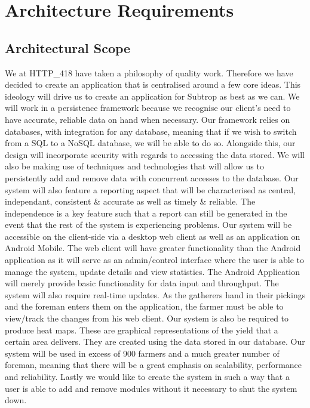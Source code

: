 \documentclass[11pt,fleqn]{book} %
\begin{document}
	\chapter{Architecture Requirements}
	
	\section{Architectural Scope}
		We at HTTP_418 have taken a philosophy of quality work. Therefore we have decided to create an application that is centralised around a few core ideas. This ideology will drive us to create an application for Subtrop as best as we can.\newline
		We will work in a persistence framework because we recognise our client’s need to have accurate, reliable data on hand when necessary. Our framework relies on databases, with integration for any database, meaning that if we wish to switch from a SQL to a NoSQL database, we will be able to do so. Alongside this, our design will incorporate security with regards to accessing the data stored. We will also be making use of techniques and technologies that will allow us to persistently add and remove data with concurrent accesses to the database.\newline
		Our system will also feature a reporting aspect that will be characterised as central, independant, consistent & accurate as well as timely & reliable. The independence is a key feature such that a report can still be generated in the event that the rest of the system is experiencing problems.\newline
		Our system will be accessible on the client-side via a desktop web client as well as an application on Android Mobile. The web client will have greater functionality than the Android application as it will serve as an admin/control interface where the user is able to manage the system, update details and view statistics. The Android Application will merely provide basic functionality for data input and throughput.\newline
		The system will also require real-time updates. As the gatherers hand in their pickings and the foreman enters them on the application, the farmer must be able to view/track the changes from his web client.\newline
		Our system is also be required to produce heat maps. These are graphical representations of the yield that a certain area delivers. They are created using the data stored in our database.\newline
		Our system will be used in excess of 900 farmers and a much greater number of foreman, meaning that there will be a great emphasis on scalability, performance and reliability. \newline
		Lastly we would like to create the system in such a way that a user is able to add and remove modules without it necessary to shut the system down.\newline
\end{document}
